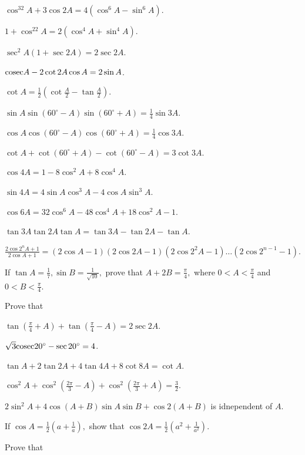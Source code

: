 \item $\cos^32A + 3\cos 2A = 4(\cos^6A - \sin^6A)$.
\item $1 + \cos^22A = 2(\cos^4A + \sin^4A)$.
\item $\sec^2A(1 + \sec2A) = 2\sec2A$.
\item ${\rm cosec} A - 2\cot 2A\cos A = 2\sin A$.
\item $\cot A = \frac{1}{2}\left(\cot\frac{A}{2} - \tan\frac{A}{2}\right)$.
\item $\sin A\sin(60^\circ - A)\sin(60^\circ + A) = \frac{1}{4}\sin 3A$.
\item $\cos A\cos(60^\circ - A)\cos(60^\circ + A) = \frac{1}{4}\cos 3A$.
\item $\cot A + \cot(60^\circ + A) - \cot(60^\circ - A) = 3\cot 3A$.
\item $\cos 4A = 1 - 8\cos^2A + 8\cos^4A$.
\item $\sin 4A = 4\sin A\cos^3A - 4\cos A\sin^3A$.
\item $\cos 6A = 32\cos^6A - 48\cos^4A + 18\cos^2A - 1$.
\item $\tan 3A\tan 2A\tan A = \tan 3A - \tan 2A - \tan A$.
\item $\frac{2\cos2^nA + 1}{2\cos A + 1} = (2\cos A - 1)(2\cos 2A - 1)(2\cos2^2A - 1)\ldots(2\cos2^{n - 1} - 1)$.
\item If $\tan A= \frac{1}{7}, \sin B = \frac{1}{\sqrt{10}},$ prove that $A + 2B = \frac{\pi}{4},$ where $0 < A <
  \frac{\pi}{4}$ and  $0 < B < \frac{\pi}{4}$.
\stopitemize

Prove that

\item $\tan\left(\frac{\pi}{4} + A\right) + \tan\left(\frac{\pi}{4} - A\right) = 2\sec2A$.
\item $\sqrt{3}{\rm cosec} 20^\circ - \sec 20^\circ = 4$.
\item $\tan A + 2\tan 2A + 4\tan 4A + 8\cot 8A = \cot A$.
\item $\cos^2A + \cos^2\left(\frac{2\pi}{3} - A\right) + \cos^2\left(\frac{2\pi}{3} + A\right) = \frac{3}{2}$.
\item $2\sin^2A + 4\cos (A + B)\sin A\sin B + \cos2(A + B)$ is idnependent of $A$.
\item If $\cos A = \frac{1}{2}\left(a + \frac{1}{a}\right),$ show that $\cos 2A = \frac{1}{2}\left(a^2 +
  \frac{1}{a^2}\right)$.
\stopitemize

Prove that

